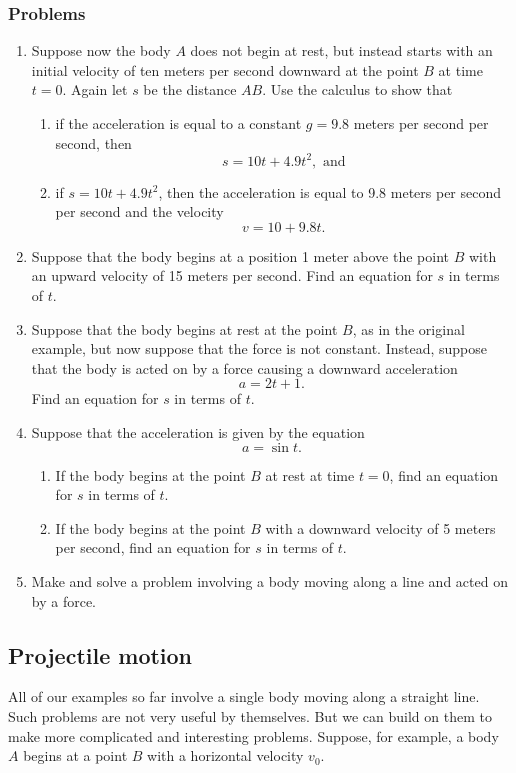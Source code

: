 \documentclass[twoside,openright]{article}
\begin{document}
\subsubsection*{Problems}
\begin{enumerate}
\item Suppose now the body $A$ does not begin at rest, but instead
  starts with an initial velocity of ten meters per second downward at
  the point $B$ at time $t =0$.  Again let $s$ be the distance $AB$.
  Use the calculus to show that
  \begin{enumerate}
  \item if the acceleration is equal to a constant $g = 9.8$ meters
    per second per second, then
$$s = 10t + 4.9t^2,\mbox{ and}$$
\item if $s = 10t + 4.9t^2$, then the acceleration is equal to 9.8
  meters per second per second and the velocity
$$v = 10 + 9.8t.$$
\end{enumerate}
\item Suppose that the body begins at a position 1 meter above the
  point $B$ with an upward velocity of 15 meters per second.  Find an
  equation for $s$ in terms of $t$.
\item Suppose that the body begins at rest at the point $B$, as in the
  original example, but now suppose that the force is not constant.
  Instead, suppose that the body is acted on by a force causing a
  downward acceleration $$a = 2t + 1.$$ Find an equation for $s$ in
  terms of $t$.
\item Suppose that the acceleration is given by the equation
$$a = \sin t.$$ 
\begin{enumerate}
\item If the body begins at the point $B$ at rest at time $t=0$, find
  an equation for $s$ in terms of $t$.
\item If the body begins at the point $B$ with a downward velocity of
  5 meters per second, find an equation for $s$ in terms of $t$.
\end{enumerate}
\item Make and solve a problem involving a body moving along a line
  and acted on by a force.

\end{enumerate}

\subsection*{Projectile motion}

All of our examples so far involve a single body moving along a
straight line.  Such problems are not very useful by themselves.  But
we can build on them to make more complicated and interesting
problems.  Suppose, for example, a body $A$ begins at a point $B$ with
a horizontal velocity $v_0$.
\end{document}
